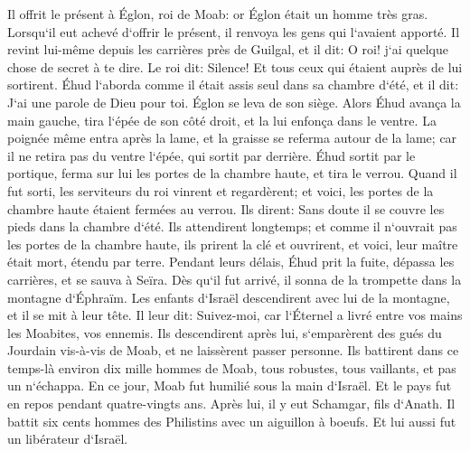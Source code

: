 \verse Il offrit le présent à Églon, roi de Moab: or Églon était un homme très gras. 
\verse Lorsqu`il eut achevé d`offrir le présent, il renvoya les gens qui l`avaient apporté. 
\verse Il revint lui-même depuis les carrières près de Guilgal, et il dit: O roi! j`ai quelque chose de secret à te dire. Le roi dit: Silence! Et tous ceux qui étaient auprès de lui sortirent. 
\verse Éhud l`aborda comme il était assis seul dans sa chambre d`été, et il dit: J`ai une parole de Dieu pour toi. Églon se leva de son siège. 
\verse Alors Éhud avança la main gauche, tira l`épée de son côté droit, et la lui enfonça dans le ventre. 
\verse La poignée même entra après la lame, et la graisse se referma autour de la lame; car il ne retira pas du ventre l`épée, qui sortit par derrière. 
\verse Éhud sortit par le portique, ferma sur lui les portes de la chambre haute, et tira le verrou. 
\verse Quand il fut sorti, les serviteurs du roi vinrent et regardèrent; et voici, les portes de la chambre haute étaient fermées au verrou. Ils dirent: Sans doute il se couvre les pieds dans la chambre d`été. 
\verse Ils attendirent longtemps; et comme il n`ouvrait pas les portes de la chambre haute, ils prirent la clé et ouvrirent, et voici, leur maître était mort, étendu par terre. 
\verse Pendant leurs délais, Éhud prit la fuite, dépassa les carrières, et se sauva à Seïra. 
\verse Dès qu`il fut arrivé, il sonna de la trompette dans la montagne d`Éphraïm. Les enfants d`Israël descendirent avec lui de la montagne, et il se mit à leur tête. 
\verse Il leur dit: Suivez-moi, car l`Éternel a livré entre vos mains les Moabites, vos ennemis. Ils descendirent après lui, s`emparèrent des gués du Jourdain vis-à-vis de Moab, et ne laissèrent passer personne. 
\verse Ils battirent dans ce temps-là environ dix mille hommes de Moab, tous robustes, tous vaillants, et pas un n`échappa. 
\verse En ce jour, Moab fut humilié sous la main d`Israël. Et le pays fut en repos pendant quatre-vingts ans. 
\verse Après lui, il y eut Schamgar, fils d`Anath. Il battit six cents hommes des Philistins avec un aiguillon à boeufs. Et lui aussi fut un libérateur d`Israël. 

